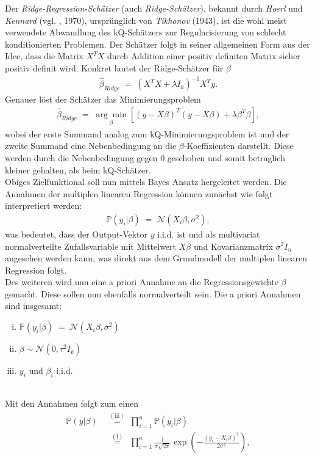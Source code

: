 Der \textit{Ridge-Regression-Schätzer} (auch \textit{Ridge-Schätzer}), bekannt durch \textit{Hoerl} und \textit{Kennard} (vgl. \cite{Ridge}, 1970), ursprünglich von \textit{Tikhonov} (1943), ist die wohl meist verwendete Abwandlung des kQ-Schätzers zur Regularisierung von schlecht konditionierten Problemen. Der Schätzer folgt in seiner allgemeinen Form aus der Idee, dass die Matrix \(X^TX\) durch Addition einer positiv definiten Matrix sicher positiv definit wird. Konkret lautet der Ridge-Schätzer für \(\beta\)
\begin{align*}
	\hat{\beta}_{Ridge}\;=\;\left(X^TX+\lambda I_k\right)^{-1}X^Ty.
\end{align*}
Genauer löst der Schätzer das Minimierungsproblem
\begin{align*}
	\hat{\beta}_{Ridge}\;=\; \underset{\beta}{\arg\min}\left[\left(y-X\beta\right)^T\left(y-X\beta\right)+\lambda\beta^T\beta\right],
\end{align*}
wobei der erste Summand analog zum kQ-Minimierungsproblem ist und der zweite Summand eine Nebenbedingung an die \(\beta\)-Koeffizienten darstellt. Diese werden durch die Nebenbedingung gegen 0 geschoben und somit betraglich kleiner gehalten, als beim kQ-Schätzer.\\
Obiges Zielfunktional soll nun mittels Bayes Ansatz hergeleitet werden. Die  Annahmen der multiplen linearen Regression können zunächst wie folgt interpretiert werden:
\begin{align*}
	\mathbb{P}(y_i\vert \beta)\;=\;\mathcal{N}(X_i\beta,\sigma^2),
\end{align*}
was bedeutet, dass der Output-Vektor \(y\) i.i.d. ist und als multivariat normalverteilte Zufallsvariable mit Mittelwert \(X\beta\) und Kovarianzmatrix \(\sigma^2I_n\) angesehen werden kann, was direkt aus dem Grundmodell der multiplen linearen Regression folgt.\\
Des weiteren wird nun eine a priori Annahme an die Regressionsgewichte \(\beta\) gemacht. Diese sollen nun ebenfalls normalverteilt sein. Die a priori Annahmen sind insgesamt:
\begin{enumerate}[(i)]
	\item \(\mathbb{P}(y_i\vert \beta)\;=\;\mathcal{N}(X_i\beta,\sigma^2)\)
	\item \(\beta\sim \mathcal{N}(0, \tau^2 I_k)\)
	\item \(y_i\) und \(\beta_i\) i.i.d.
\end{enumerate}
\hfill\\Mit den Annahmen folgt zum einen
\begin{align*}
	\mathbb{P}(y|\beta)&\;\overset{(\text{iii})}{=}\;\prod_{i=1}^{n}\mathbb{P}(y_i|\beta)\\
	&\;\:\overset{(\text{i})}{=}\:\:\prod_{i=1}^{n}\frac{1}{\sigma\sqrt{2\pi}}\exp\left(-\frac{\left(y_i-X_i\beta\right)^2}{2\sigma^2}\right),
\end{align*}
